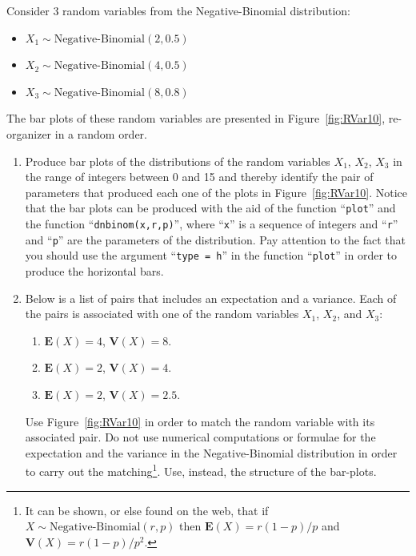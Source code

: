 \documentclass[
]{krantz}
\newcommand{\Expec}{\mathbf{E}}
\newcommand{\Var}{\mathbf{V}}
\theoremstyle{definition}
\theoremstyle{definition}
\theoremstyle{definition}
\theoremstyle{remark}
\begin{document}
Consider 3 random variables from the Negative-Binomial distribution:

\begin{itemize}
\item
  \(X_1 \sim \mbox{Negative-Binomial}(2,0.5)\)
\item
  \(X_2 \sim \mbox{Negative-Binomial}(4,0.5)\)
\item
  \(X_3 \sim \mbox{Negative-Binomial}(8,0.8)\)
\end{itemize}

The bar plots of these random variables are presented in
Figure~\ref{fig:RVar10}, re-organizer in a random order.

\begin{enumerate}
\def\labelenumi{\arabic{enumi}.}
\item
  Produce bar plots of the distributions of the random variables
  \(X_1\), \(X_2\), \(X_3\) in the range of integers between 0 and 15 and
  thereby identify the pair of parameters that produced each one of
  the plots in Figure~\ref{fig:RVar10}. Notice that the bar plots
  can be produced with the aid of the function ``\texttt{plot}'' and the
  function ``\texttt{dnbinom(x,r,p)}'', where ``\texttt{x}'' is a sequence of integers
  and ``\texttt{r}'' and ``\texttt{p}'' are the parameters of the distribution. Pay
  attention to the fact that you should use the argument ``\texttt{type\ =\ h}''
  in the function ``\texttt{plot}'' in order to produce the horizontal bars.
\item
  Below is a list of pairs that includes an expectation and a
  variance. Each of the pairs is associated with one of the random
  variables \(X_1\), \(X_2\), and \(X_3\):

  \begin{enumerate}
  \def\labelenumii{\arabic{enumii}.}
  \item
    \(\Expec(X) = 4\), \(\Var(X) = 8\).
  \item
    \(\Expec(X) = 2\), \(\Var(X) = 4\).
  \item
    \(\Expec(X) = 2\), \(\Var(X) = 2.5\).
  \end{enumerate}

  Use Figure~\ref{fig:RVar10} in order to match the random
  variable with its associated pair. Do not use numerical computations
  or formulae for the expectation and the variance in the
  Negative-Binomial distribution in order to carry out the
  matching\footnote{It can be shown, or else found on the web, that if
    \(X\sim \mbox{Negative-Binomial}(r,p)\) then \(\Expec(X) = r(1-p)/p\)
    and \(\Var(X) = r(1-p)/p^2\).}. Use, instead, the structure of the bar-plots.
\end{enumerate}
\end{document}
